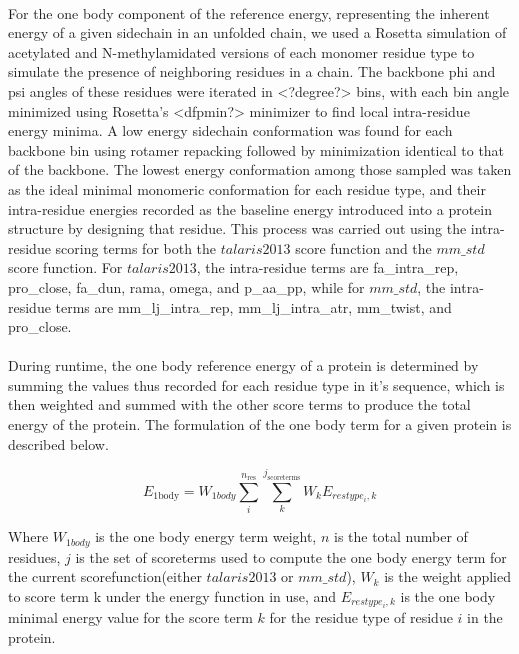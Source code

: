\paragraph{}
For the one body component of the reference energy, representing the inherent energy of a given sidechain in an unfolded chain, we used a Rosetta simulation of acetylated and N-methylamidated versions of each monomer residue type to simulate the presence of neighboring residues in a chain.
The backbone phi and psi angles of these residues were iterated in <?degree?> bins, with each bin angle minimized using Rosetta's <dfpmin?> minimizer to find local intra-residue energy minima.
A low energy sidechain conformation was found for each backbone bin using rotamer repacking followed by minimization identical to that of the backbone.
The lowest energy conformation among those sampled was taken as the ideal minimal monomeric conformation for each residue type, and their intra-residue energies recorded as the baseline energy introduced into a protein structure by designing that residue.
This process was carried out using the intra-residue scoring terms for both the $talaris2013$ score function and the $mm\_std$ score function.
For $talaris2013$, the intra-residue terms are fa\_intra\_rep, pro\_close, fa\_dun, rama, omega, and p\_aa\_pp, while for $mm\_std$, the intra-residue terms are mm\_lj\_intra\_rep, mm\_lj\_intra\_atr, mm\_twist, and pro\_close.

\paragraph{}
During runtime, the one body reference energy of a protein is determined by summing the values thus recorded for each residue type in it's sequence, which is then weighted and summed with the other score terms to produce the total energy of the protein.
The formulation of the one body term for a given protein is described below.

\begin{equation}
E_{\text{1body}} = W_{1body} \sum_{i}^{n_{\text{res}}} \sum_{k}^{j_{\text{scoreterms}}} W_{k} E_{restype_{i},k}
\end{equation}

Where $W_{1body}$ is the one body energy term weight, $n$ is the total number of residues, $j$ is the set of scoreterms used to compute the one body energy term for the current scorefunction(either $talaris2013$ or $mm\_std$), $W_{k}$ is the weight applied to score term k under the energy function in use, and $E_{restype_{i},k}$ is the one body minimal energy value for the score term $k$ for the residue type of residue $i$ in the protein.


